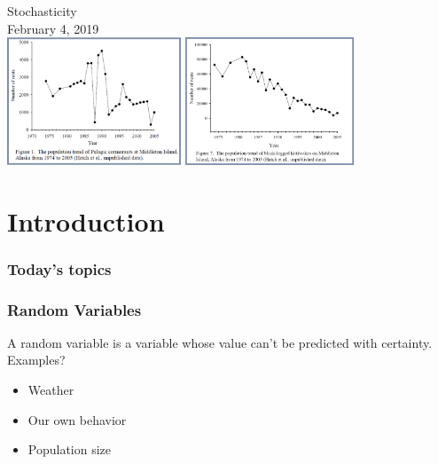 \documentclass[color=usenames,dvipsnames]{beamer}\usepackage[]{graphicx}\usepackage[]{color}
\begin{document}
\begin{frame}[plain]
  \begin{center}
    {\Huge Stochasticity} \\
    { February 4, 2019} \\
    \vfill
    \includegraphics[height=3.8cm,keepaspectratio]{figs/pelagic-cormorants} \hspace{0.1cm}
    \includegraphics[height=3.8cm,keepaspectratio]{figs/kittiwakes} %
  \end{center}
\end{frame}




\section{Introduction}


\begin{frame}[plain]
  \frametitle{Today's topics}
  \tableofcontents%
\end{frame}




\begin{frame}
  \frametitle{Random Variables}
  \large
  A random variable is a variable whose value can't be predicted
  with certainty. \\
  \pause
  \vfill
  Examples?
  \begin{itemize}
    \item Weather
    \item Our own behavior
    \item Population size
  \end{itemize}
\end{frame}
\end{document}
